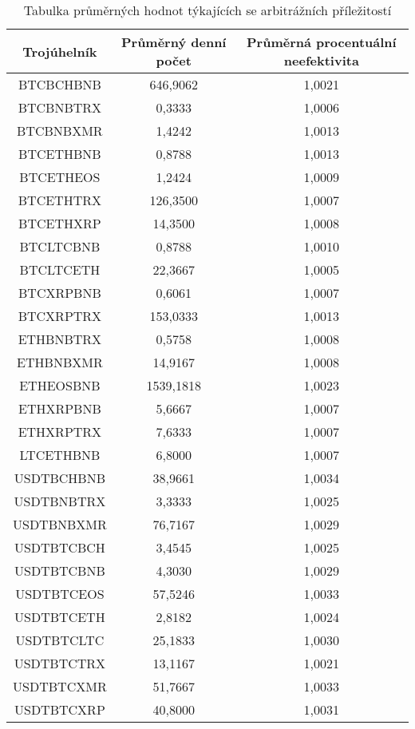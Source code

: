\begin{table}\centering
\caption{Tabulka průměrných hodnot týkajících se arbitrážních příležitostí}
\label{table_averages}
\begin{tabular}{|| c | c | c ||}\hline Trojúhelník & Průměrný denní počet & Průměrná procentuální neefektivita\\ [0.5ex]
 \hline\hline BTCBCHBNB & 646,9062 & 1,0021\\ 
 \hline BTCBNBTRX & 0,3333 & 1,0006\\ 
 \hline BTCBNBXMR & 1,4242 & 1,0013\\ 
 \hline BTCETHBNB & 0,8788 & 1,0013\\ 
 \hline BTCETHEOS & 1,2424 & 1,0009\\ 
 \hline BTCETHTRX & 126,3500 & 1,0007\\ 
 \hline BTCETHXRP & 14,3500 & 1,0008\\ 
 \hline BTCLTCBNB & 0,8788 & 1,0010\\ 
 \hline BTCLTCETH & 22,3667 & 1,0005\\ 
 \hline BTCXRPBNB & 0,6061 & 1,0007\\ 
 \hline BTCXRPTRX & 153,0333 & 1,0013\\ 
 \hline ETHBNBTRX & 0,5758 & 1,0008\\ 
 \hline ETHBNBXMR & 14,9167 & 1,0008\\ 
 \hline ETHEOSBNB & 1539,1818 & 1,0023\\ 
 \hline ETHXRPBNB & 5,6667 & 1,0007\\ 
 \hline ETHXRPTRX & 7,6333 & 1,0007\\ 
 \hline LTCETHBNB & 6,8000 & 1,0007\\ 
 \hline USDTBCHBNB & 38,9661 & 1,0034\\ 
 \hline USDTBNBTRX & 3,3333 & 1,0025\\ 
 \hline USDTBNBXMR & 76,7167 & 1,0029\\ 
 \hline USDTBTCBCH & 3,4545 & 1,0025\\ 
 \hline USDTBTCBNB & 4,3030 & 1,0029\\ 
 \hline USDTBTCEOS & 57,5246 & 1,0033\\ 
 \hline USDTBTCETH & 2,8182 & 1,0024\\ 
 \hline USDTBTCLTC & 25,1833 & 1,0030\\ 
 \hline USDTBTCTRX & 13,1167 & 1,0021\\ 
 \hline USDTBTCXMR & 51,7667 & 1,0033\\ 
 \hline USDTBTCXRP & 40,8000 & 1,0031\\ 

\end{tabular}
\end{table}
